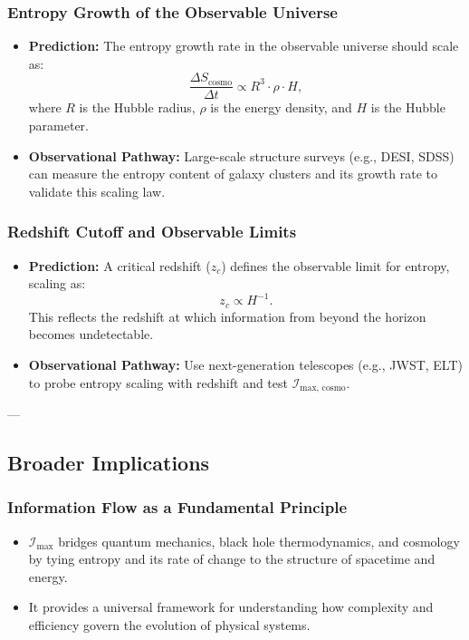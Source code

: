 \documentclass[12pt]{article}
\begin{document}
\subsubsection{Entropy Growth of the Observable Universe}
\begin{itemize}
    \item \textbf{Prediction:} The entropy growth rate in the observable universe should scale as:
    \[
    \frac{\Delta S_{\text{cosmo}}}{\Delta t} \propto R^3 \cdot \rho \cdot H,
    \]
    where \( R \) is the Hubble radius, \( \rho \) is the energy density, and \( H \) is the Hubble parameter.

    \item \textbf{Observational Pathway:} Large-scale structure surveys (e.g., DESI, SDSS) can measure the entropy content of galaxy clusters and its growth rate to validate this scaling law.
\end{itemize}

\subsubsection{Redshift Cutoff and Observable Limits}
\begin{itemize}
    \item \textbf{Prediction:} A critical redshift (\( z_c \)) defines the observable limit for entropy, scaling as:
    \[
    z_c \propto H^{-1}.
    \]
    This reflects the redshift at which information from beyond the horizon becomes undetectable.

    \item \textbf{Observational Pathway:} Use next-generation telescopes (e.g., JWST, ELT) to probe entropy scaling with redshift and test \( \mathcal{I}_{\text{max, cosmo}} \).
\end{itemize}

---

\subsection{Broader Implications}
\subsubsection{Information Flow as a Fundamental Principle}
\begin{itemize}
    \item \( \mathcal{I}_{\text{max}} \) bridges quantum mechanics, black hole thermodynamics, and cosmology by tying entropy and its rate of change to the structure of spacetime and energy.
    \item It provides a universal framework for understanding how complexity and efficiency govern the evolution of physical systems.
\end{itemize}
\end{document}
